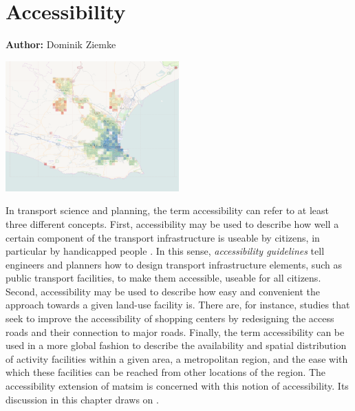 \chapter{Accessibility}
\label{ch:accessibility}

\hfill \textbf{Author:} Dominik Ziemke

\begin{center} \includegraphics[width=0.5\textwidth, angle=0]{extending/figures/accessibility/w_freeSpeed_snapshot.png} \end{center}


In transport science and planning, the term accessibility can refer to at least three different concepts. 
First, accessibility may be used to describe how well a certain component of the transport infrastructure 
is useable by citizens, in particular by handicapped people \citep{Faura2012AccessibilityEvaluationTrafficSimulation}. 
In this sense, \emph{accessibility guidelines} tell engineers and planners how to design transport 
infrastructure elements, such as public transport facilities, to make them accessible, \ie useable 
for all citizens. Second, accessibility may be used to describe how easy and convenient the approach 
towards a given land-use facility is. There are, for instance, studies \citep{Fujiyama2004AccessibleDesignPTFacilities} 
that seek to improve the accessibility of shopping centers by redesigning the access roads and their 
connection to major roads. Finally, the term accessibility can be used in a more global fashion to 
describe the availability and spatial distribution of activity facilities within a given area, \eg a 
metropolitan region, and the ease with which these facilities can be reached from other locations of 
the region. The accessibility extension of \gls{matsim} is concerned with this notion of accessibility. 
Its discussion in this chapter draws on \citet{NicolaiNagel2012HiResAccessibilityMethodInBook}.

